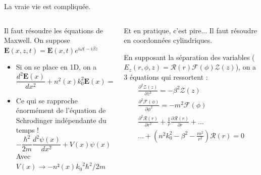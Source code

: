 \documentclass[aspectratio=149, 10pt, t]{beamer}
\begin{document}
\begin{frame}{La vraie vie est compliquée.}
    \begin{columns}
        \begin{column}{0.5\linewidth}
            Il faut résoudre les équations de Maxwell. On suppose $\boldsymbol{E}(x,z,t)=\boldsymbol{E}(x,t)e^{i\omega t - i\beta z}$
            \begin{itemize}
                \item Si on se place en 1D, on a
                \begin{equation}
\frac{d^{2} \boldsymbol{E}(x)}{d x^{2}}+n^{2}(x) k_{0}^{2} \boldsymbol{E}(x)=\beta^{2} \boldsymbol{E}(x)
\end{equation}
                \item Ce qui se rapproche énormément de l'équation de Schrodinger indépendante du temps !
                \begin{equation}
-\frac{\hbar^{2}}{2 m} \frac{d^{2} \psi(x)}{d x^{2}}+V(x) \psi(x)=E \psi(x)
\end{equation}
                Avec $V(x)\longrightarrow-n²(x){k_0}^2\hbar^2/2m$
            \end{itemize}
        \end{column}
        \begin{column}{0.5\linewidth}
            Et en pratique, c'est pire... Il faut résoudre en coordonnées cylindriques. 
            
            En supposant la séparation des variables ($E_z(r,\phi,z)=\mathcal{R}(r)\mathcal{F}(\phi)\mathcal{Z}(z)$), on a 3 équations qui ressortent :
            \begin{gather}
                \frac{\partial^{2} \mathcal{Z}(z)}{\partial z^{2}}=-\beta^{2} \mathcal{Z}(z)\\
                \frac{\partial^{2} \mathcal{F}(\phi)}{\partial \phi^{2}}=-m^{2} \mathcal{F}(\phi)\\
                \nonumber\frac{\partial^{2} \mathcal{R}(r)}{\partial r^{2}}+\frac{1}{r} \frac{\partial \mathcal{R}(r)}{\partial r}+...\\...+\left(n^{2} k_{0}^{2}-\beta^{2}-\frac{m^{2}}{r^{2}}\right) \mathcal{R}(r)=0
            \end{gather}
        \end{column}
    \end{columns}
\end{frame} 
\end{document}

